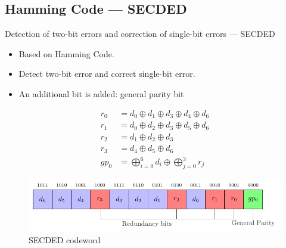 \subsection{Hamming Code — SECDED}
\begin{frame}{Detection of two-bit errors and correction of single-bit errors — SECDED}
    \begin{block}{}
        \begin{itemize}
            \justifying
            \item Based on Hamming Code.
            \item Detect two-bit error and correct single-bit error.
            \item An additional bit is added: general parity bit
        \end{itemize}
    \end{block}

    \begin{minipage}[c]{0.4\linewidth}
        \begin{equation} \label{equat:secded_encoder}
            \begin{split}
                r_{0}  &= d_{0} \oplus d_{1} \oplus d_{3} \oplus d_{4} \oplus d_{6} \\
                r_{1}  &= d_{0} \oplus d_{2} \oplus d_{3} \oplus d_{5} \oplus d_{6} \\
                r_{2}  &= d_{1} \oplus d_{2} \oplus d_{3} \\
                r_{3}  &= d_{4} \oplus d_{5} \oplus d_{6} \\
                gp_{0} &= \bigoplus_{i=0}^{6} d_{i} \oplus \bigoplus_{j=0}^{3} r_{j}
            \end{split}
        \end{equation}
    \end{minipage}\hfill%
    \begin{minipage}[c]{0.6\linewidth}
        \begin{figure}
            \centering
            \includegraphics[width=\textwidth, page=1]{src/4_strategies/img/secded.pdf}
            \caption{SECDED codeword}
            \label{fig:secded_codeword}
        \end{figure}
    \end{minipage}
\end{frame}
